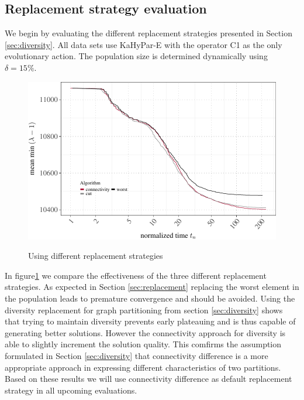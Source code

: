 \documentclass[a4paper,12pt,titlepage, BCOR7mm,headsepline]{scrbook}
\numberwithin{equation}{section}
\begin{document}
\subsection{Replacement strategy evaluation}
We begin by evaluating the different replacement strategies presented in Section \ref{sec:diversity}. All data sets use KaHyPar-E with the operator C1 as the only evolutionary action. The population size is determined dynamically using $\delta = 15\%$. 
\begin{figure}[H]
\caption{Using different replacement strategies}

\begin{center}
\includegraphics{rnw/tuning_subset_plots/replace_plot-1}\label{fig:replacement}
\end{center}

\end{figure}
In figure\ref{fig:replacement} we compare the effectiveness of the three different replacement strategies. As expected in Section \ref{sec:replacement} replacing the worst element in the population leads to premature convergence and should be avoided. Using the diversity replacement for graph partitioning \cite{sanders2012distributed} from section \ref{sec:diversity} shows that trying to maintain diversity prevents early plateauing and is thus capable of generating better solutions. However the connectivity approach for diversity is able to slightly increment the solution quality. This comfirms the assumption formulated in Section \ref{sec:diversity} that connectivity difference is a more appropriate approach in expressing different characteristics of two partitions. Based on these results we will use connectivity difference as default replacement strategy in all upcoming evaluations.
\end{document}
